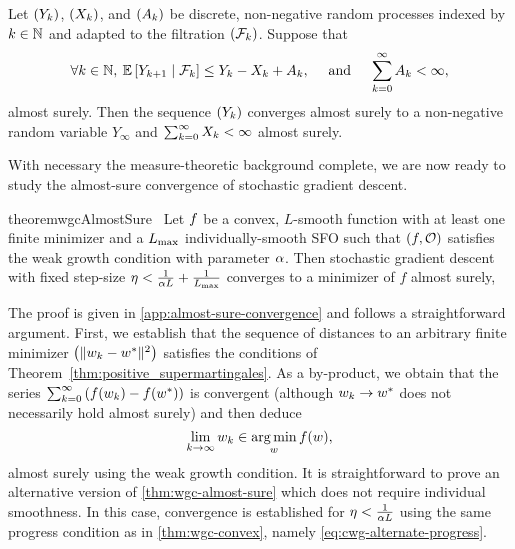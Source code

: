 \begin{theorem}\label{thm:positive_supermartingales}
    Let \( \seq{Y_\iter} \), \( \seq{X_\iter} \), and \( \seq{A_\iter} \) be discrete, non-negative random processes indexed by \( \iter \in \bbN \) and adapted to the filtration \( \seq{\calF_\iter} \).
    Suppose that
    \begin{align*}
        \forall \iter \in \bbN, \: \E \sbr{Y_{\iter+1} \mid \calF_\iter} \leq Y_\iter - X_\iter + A_\iter,
        \quad \text{ and } \quad 
        \sum_{k=0}^{\infty} A_\iter < \infty,
    \end{align*}
    almost surely.
    Then the sequence \( \seq{Y_\iter} \) converges almost surely to a non-negative random variable \( Y_\infty \) and \( \sum_{k=0}^{\infty} X_\iter < \infty \) almost surely.
\end{theorem}
\noindent With necessary the measure-theoretic background complete, we are now ready to study the almost-sure convergence of stochastic gradient descent.

\begin{restatable}{theorem}{wgcAlmostSure}~\label{thm:wgc-almost-sure}
    Let \( \f \) be a convex, \( L \)-smooth function with at least one finite minimizer and \oracle{} a \( \Lmax \) individually-smooth \ac{SFO} such that \( \rbr{f, \oracle{}} \) satisfies the weak growth condition with parameter \( \wgc \).
    Then stochastic gradient descent with fixed step-size \( \eta < \frac{1}{\wgc L} + \frac{1}{\Lmax} \) converges to a minimizer of \( f \) almost surely,
\end{restatable}

The proof is given in \autoref{app:almost-sure-convergence} and follows a straightforward argument.
First, we establish that the sequence of distances to an arbitrary finite minimizer \( \seq{\norm{\wk - \wopt}^2} \) satisfies the conditions of Theorem~\ref{thm:positive_supermartingales}.
As a by-product, we obtain that the series \( \sum_{k=0}^{\infty} \rbr{f(\wk) - f(\wopt)} \) is convergent (although \( \wk \rightarrow \wopt \) does not necessarily hold almost surely) and then deduce
\[ \lim_{k\rightarrow\infty} \wk \in \argmin_w f(\w), \] 
almost surely using the weak growth condition.
It is straightforward to prove an alternative version of \autoref{thm:wgc-almost-sure} which does not require individual smoothness.
In this case, convergence is established for \( \eta < \frac{1}{\wgc L} \) using the same progress condition as in \autoref{thm:wgc-convex}, namely \autoref{eq:cwg-alternate-progress}.

